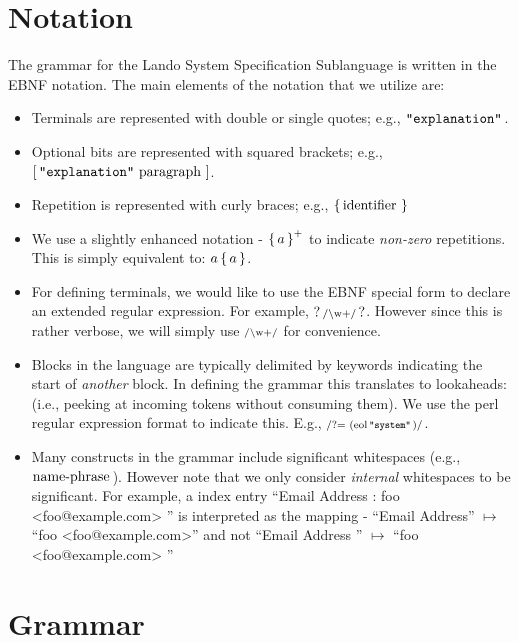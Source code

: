 \documentclass{article}
\begin{document}
\section{Notation}

The grammar for the Lando System Specification Sublanguage is written
in the EBNF notation. The main elements of the notation that we
utilize are:
\begin{itemize}
\item Terminals are represented with double or single quotes;
  e.g., $\mathop{\texttt{"explanation"}}\,$.
\item Optional bits are represented with squared brackets;
  e.g., $\mathop{\operatorname{[} \mathop{\texttt{"explanation"}}\, \mathop{\textrm{paragraph}}\, \operatorname{]}}$.
\item Repetition is represented with curly braces;
  e.g., $\mathop{\operatorname{\{} \mathop{\textrm{identifier}}\, \operatorname{\}}}$
\item We use a slightly enhanced notation - $\mathop{\operatorname{\{} a \operatorname{\}}^+}$ to
  indicate \emph{non-zero} repetitions. This is simply equivalent to:
  $a \mathop{\operatorname{\{} a \operatorname{\}}}$.
\item For defining terminals, we would like to use the EBNF special
  form to declare an extended regular expression. For example,
  $\mathop{?\, \textrm{\scriptsize /\textbackslash w\\+/} \,?}$. However since this is rather
  verbose, we will simply use $\textrm{\scriptsize /\textrm{\textbackslash w\\+}/}$
  for convenience.
\item Blocks in the language are typically delimited by keywords
  indicating the start of \emph{another} block. In defining the
  grammar this translates to lookaheads: (i.e., peeking at incoming
  tokens without consuming them). We use the perl regular expression
  format to indicate this. E.g., $\textrm{\scriptsize /?= (\ensuremath{\mathop{\textrm{eol}}}\,\ensuremath{\mathop{\texttt{"system"}}}\,)/}$.
\item Many constructs in the grammar include significant whitespaces
  (e.g., $\mathop{\textrm{name-phrase}}\,$). However note that we only consider
  \emph{internal} whitespaces to be significant. For example, a index
  entry ``Email Address : foo <foo@example.com> '' is interpreted as
  the mapping - ``Email Address'' $\mapsto$ ``foo <foo@example.com>''
  and not ``Email Address '' $\mapsto$ ``foo <foo@example.com> ''
\end{itemize}

\newpage

\section{Grammar}
\end{document}
